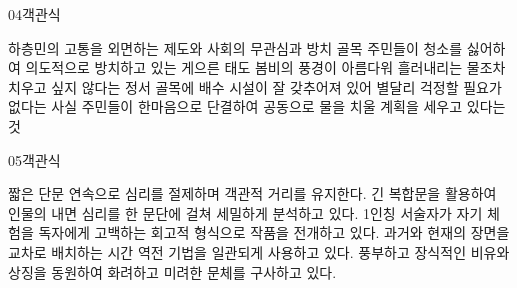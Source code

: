 \documentclass[fs85,seriesWit]{korfarm-base}
\begin{document}
\begin{kfQBlock}{04}{객관식}
\begin{kfChoices}
\kfChoice 하층민의 고통을 외면하는 제도와 사회의 무관심과 방치
\kfChoice 골목 주민들이 청소를 싫어하여 의도적으로 방치하고 있는 게으른 태도
\kfChoice 봄비의 풍경이 아름다워 흘러내리는 물조차 치우고 싶지 않다는 정서
\kfChoice 골목에 배수 시설이 잘 갖추어져 있어 별달리 걱정할 필요가 없다는 사실
\kfChoice 주민들이 한마음으로 단결하여 공동으로 물을 치울 계획을 세우고 있다는 것
\end{kfChoices}
\end{kfQBlock}

\begin{kfQBlock}{05}{객관식}
\begin{kfChoices}
\kfChoice 짧은 단문 연속으로 심리를 절제하며 객관적 거리를 유지한다.
\kfChoice 긴 복합문을 활용하여 인물의 내면 심리를 한 문단에 걸쳐 세밀하게 분석하고 있다.
\kfChoice 1인칭 서술자가 자기 체험을 독자에게 고백하는 회고적 형식으로 작품을 전개하고 있다.
\kfChoice 과거와 현재의 장면을 교차로 배치하는 시간 역전 기법을 일관되게 사용하고 있다.
\kfChoice 풍부하고 장식적인 비유와 상징을 동원하여 화려하고 미려한 문체를 구사하고 있다.
\end{kfChoices}
\end{kfQBlock}

\kfEndMC

\end{document}
